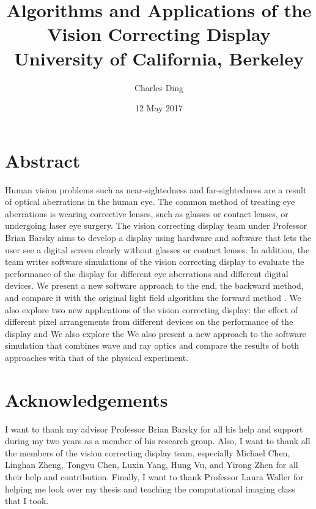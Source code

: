 \documentclass[12pt]{report}
\begin{document}
\title{
	{Algorithms and Applications of the Vision Correcting Display}\\
	{\large University of California, Berkeley}\\
}
\author{Charles Ding}
\date{12 May 2017}

\maketitle

\chapter*{Abstract}
Human vision problems such as near-sightedness and far-sightedness are a result of optical aberrations in the human eye. The common method of treating eye aberrations is wearing corrective lenses, such as glasses or contact lenses, or undergoing laser eye surgery. The vision correcting display team under Professor Brian Barsky aims to develop a display using hardware and software that lets the user see a digital screen clearly without glasses or contact lenses. In addition, the team writes software simulations of the vision correcting display to evaluate the performance of the display for different eye aberrations and different digital devices. We present a new software approach to the end, the backward method, and compare it with the original light field algorithm \cite{Huang:EECS-2013-206} the forward method \cite{Wu:EECS-2016-67}. We also explore two new applications of the vision correcting display: the effect of different pixel arrangements from different devices on the performance of the display and   We also explore the We also present a new approach to the software simulation that combines wave and ray optics and compare the results of both approaches with that of the physical experiment. 

\chapter*{Acknowledgements}
I want to thank my advisor Professor Brian Barsky for all his help and support during my two years as a member of his research group. Also, I want to thank all the members of the vision correcting display team, especially Michael Chen, Linghan Zheng, Tongyu Chen, Luxin Yang, Hung Vu, and Yirong Zhen for all their help and contribution. Finally, I want to thank Professor Laura Waller for helping me look over my thesis and teaching the computational imaging class that I took.
\end{document}
